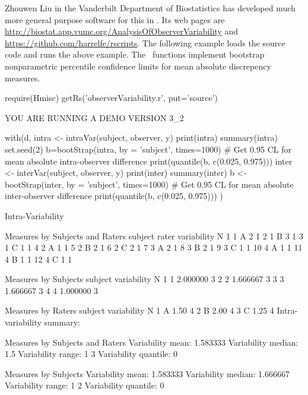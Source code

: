 Zhouwen Liu in the Vanderbilt Department of Biostatistics has
developed much more general purpose software for this in \R.  Its web
pages are
\url{http://biostat.app.vumc.org/AnalysisOfObserverVariability}
and \url{https://github.com/harrelfe/rscripts}.
The following example loads the source code and runs the above
example.  The \R\ functions implement bootstrap nonparametric
percentile confidence limits for mean absolute discrepency measures.
\begin{Schunk}
\begin{Sinput}
require(Hmisc)
getRs('observerVariability.r', put='source')
\end{Sinput}
\begin{Soutput}
YOU ARE RUNNING A DEMO VERSION 3_2 
\end{Soutput}
\begin{Sinput}
with(d, {
  intra <- intraVar(subject, observer, y)
  print(intra)
  summary(intra)
  set.seed(2)
  b=bootStrap(intra, by = 'subject', times=1000)
  # Get 0.95 CL for mean absolute intra-observer difference
  print(quantile(b, c(0.025, 0.975)))
  inter <- interVar(subject, observer, y)
  print(inter)
  summary(inter)
  b <- bootStrap(inter, by = 'subject', times=1000)
  # Get 0.95 CL for mean absolute inter-observer difference
  print(quantile(b, c(0.025, 0.975)))
})
\end{Sinput}
\begin{Soutput}
Intra-Variability 

Measures by Subjects and Raters
   subject rater variability N
1        1     A           2 1
2        1     B           3 1
3        1     C           1 1
4        2     A           1 1
5        2     B           2 1
6        2     C           2 1
7        3     A           2 1
8        3     B           2 1
9        3     C           1 1
10       4     A           1 1
11       4     B           1 1
12       4     C           1 1

Measures by Subjects
  subject variability N
1       1    2.000000 3
2       2    1.666667 3
3       3    1.666667 3
4       4    1.000000 3

Measures by Raters
  subject variability N
1       A        1.50 4
2       B        2.00 4
3       C        1.25 4
Intra-variability summary:

Measures by Subjects and Raters
Variability mean:  1.583333 
Variability median:  1.5 
Variability range:  1 3 
Variability quantile: 
0%:  1   25%:  1   50%:  1.5   75%:  2   100%:  3 

Measures by Subjects
Variability mean:  1.583333 
Variability median:  1.666667 
Variability range:  1 2 
Variability quantile: 
0%:  1   25%:  1.5   50%:  1.666667   75%:  1.75   100%:  2 


\end{Soutput}
\end{Schunk}

